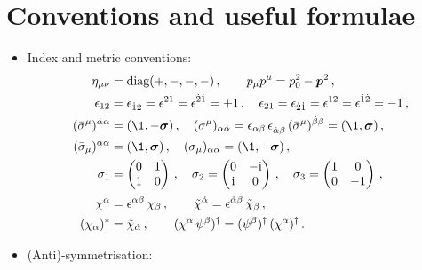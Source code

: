 \appendix

\chapter{Conventions and useful formulae}
\label{sec:Conventions}

\begin{itemize}
\item Index and metric conventions:
\begin{align*}
%
\eta_{\mu\nu} &= \text{diag}(+,-,-,-)\, ,  \qquad  p_{\mu}p^{\mu}=p_{0}^{2}-{\vec p}^{2} \, ,
\nn\\
%
\epsilon_{12}&=\epsilon_{\dot 1\dot 2}=\epsilon^{21}=\epsilon^{\dot 2\dot 1}=+1\, , \quad
\epsilon_{21}=\epsilon_{\dot 2\dot 1}=\epsilon^{12}=\epsilon^{\dot 1\dot 2}=-1\, ,\nn \\
(\bar\sigma^{\mu})^{\da\a}&=(\1,-\vec\sigma) \, , \quad
(\sigma^{\mu})_{\a\da}=\epsilon_{\a\b}
\, \epsilon_{\da\db}\, (\bar\sigma^{\mu})^{\db\b}= (\1,\vec\sigma) \, ,\nn \\
(\bar\sigma_{\mu})^{\da\a}&=(\1,\vec\sigma) \, , \quad 
(\sigma_{\mu})_{\a\da}=(\1,-\vec\sigma)\, , \nn\\
\sigma_{1}&=   
\begin{pmatrix} %
      0 & 1 \\
      1 & 0 \\
\end{pmatrix}\, ,
\quad 
\sigma_{2}=   
\begin{pmatrix} %
      0 & -\i \\
      \i & 0 \\
\end{pmatrix}\, ,
\quad 
\sigma_{3}=   
\begin{pmatrix} %
      1 &  0 \\
      0 & -1 \\
\end{pmatrix}\, , \nn\\
\chi^{\a}&= \epsilon^{\a\b}\,\chi_{\b}\, ,\qquad
\tilde\chi^{\da}= \epsilon^{\da\db}\,\tilde\chi_{\b}\, , \nn \\
(\chi_{\a})^{\ast} & =\tilde\chi_{\da}\, , \qquad
(\chi^{\a}\, \psi^{\b})^{\dagger}= (\psi^{\b})^{\dagger} \, (\chi^{\a})^{\dagger}\, .
\end{align*}
\item (Anti)-symmetrisation:
\begin{align*}

\end{align*}
\end{itemize}
